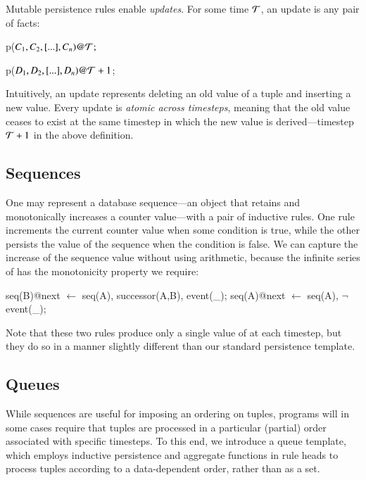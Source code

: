 Mutable persistence rules enable {\em updates}.  For some time $\Tau$, an
update is any pair of facts:

\begin{dedalus}
p\nega($C_1,C_2,[...],C_n)@\Tau;$
\end{dedalus}

\begin{dedalus}
p\pos($D_1,D_2,[...],D_n)@\Tau+1$;
\end{dedalus}


\noindent
Intuitively, an update represents deleting an old value of a tuple and
inserting a new value.  Every update is {\em atomic across timesteps}, meaning
that the old value ceases to exist at the same timestep in which the new value
is derived---timestep $\Tau+1$ in the above definition.


\subsection{Sequences}
One may represent a database sequence---an object that retains and monotonically increases a counter value---with a pair of inductive rules.  One rule increments the current counter value when some condition is 
true, while the other persists the value of the sequence when the condition is false.  We can capture the increase
of the sequence value without using arithmetic, because the infinite series of  has the monotonicity
property we require:

\begin{Dedalus}
seq(B)@next \(\leftarrow\) seq(A), successor(A,B), event(_);  
seq(A)@next \(\leftarrow\) seq(A), \(\lnot\)event(_);
\end{Dedalus}

\noindent
Note that these two rules produce only a single value of  at each timestep, but they do so in a manner slightly different than our standard persistence template.

\subsection{Queues}

While sequences are useful for imposing an ordering on tuples, programs will in
some cases require that tuples are processed in a particular (partial) order
associated with specific timesteps.  To this end, we introduce a queue template,
which employs inductive persistence and aggregate functions in rule heads to
process tuples according to a data-dependent order, rather than as a set.

